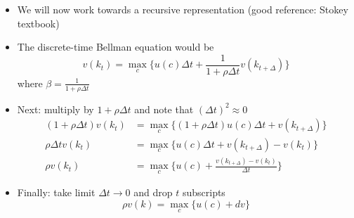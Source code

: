 \documentclass[10pt]{beamer}
\begin{document}
\begin{frame}{}
\begin{itemize}
\item We will now work towards a recursive representation (good reference: Stokey textbook)

\item The discrete-time Bellman equation would be
\begin{equation*}
	v(k_t) = \max_c \Big\{ u(c) \Delta t + \frac{1}{1 + \rho \Delta t} v(k_{t+\Delta}) \Big\}
\end{equation*}
where $\beta = \frac{1}{1+ \rho \Delta t}$

\item Next: multiply by $1 + \rho \Delta t$ and note that $(\Delta t)^2 \approx 0$
\begin{align*}
	(1 + \rho \Delta t) v(k_t) &= \max_c \Big\{ (1 + \rho \Delta t) u(c) \Delta t + v(k_{t+\Delta}) \Big\} \\
	\rho \Delta t v(k_t) &= \max_c \Big\{ u(c) \Delta t + v(k_{t+\Delta}) - v(k_t) \Big\} \\
	\rho v(k_t) &= \max_c \Big\{ u(c) + \frac{v(k_{t+\Delta}) - v(k_t)}{\Delta t} \Big\}
\end{align*}

\item Finally: take limit $\Delta t \to 0$ and drop $t$ subscripts
\begin{equation*}
	\rho v(k) = \max_c \Big\{ u(c) + dv \Big\}
\end{equation*}
\end{itemize}
\end{frame}
\end{document}
